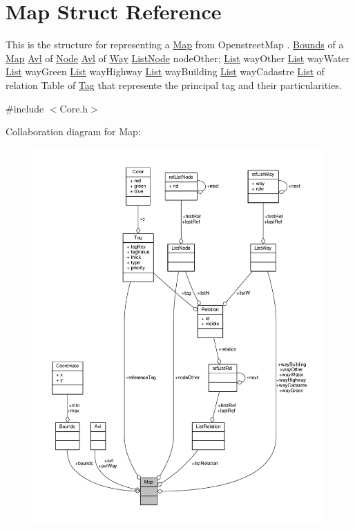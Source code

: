 \hypertarget{structMap}{\section{Map Struct Reference}
\label{structMap}
}


This is the structure for representing a \hyperlink{structMap}{Map} from Openstreet\-Map . \hyperlink{structBounds}{Bounds} of a \hyperlink{structMap}{Map} \hyperlink{structAvl}{Avl} of \hyperlink{structNode}{Node} \hyperlink{structAvl}{Avl} of \hyperlink{structWay}{Way} \hyperlink{structListNode}{List\-Node} node\-Other; \hyperlink{structList}{List} way\-Other \hyperlink{structList}{List} way\-Water \hyperlink{structList}{List} way\-Green \hyperlink{structList}{List} way\-Highway \hyperlink{structList}{List} way\-Building \hyperlink{structList}{List} way\-Cadastre \hyperlink{structList}{List} of relation Table of \hyperlink{structTag}{Tag} that represente the principal tag and their particularities.  




{\ttfamily \#include $<$Core.\-h$>$}



Collaboration diagram for Map\-:
\nopagebreak
\begin{figure}[H]
\begin{center}
\leavevmode
\includegraphics[width=350pt]{structMap__coll__graph}
\end{center}
\end{figure}
